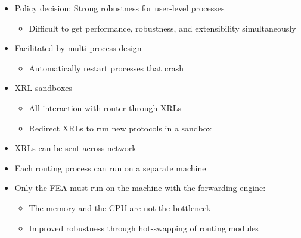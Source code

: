 \documentclass[landscape]{icsislides}
\begin{document}
\begin{slide}

\begin{itemize}

  \item Policy decision: Strong robustness for user-level processes
  \begin{itemize}
    \item Difficult to get performance, robustness, and extensibility
    simultaneously
  \end{itemize}

  \item Facilitated by multi-process design
  \begin{itemize}
    \item Automatically restart processes that crash
  \end{itemize}

  \item XRL sandboxes
  \begin{itemize}
    \item All interaction with router through XRLs
    \item Redirect XRLs to run new protocols in a sandbox
  \end{itemize}

\end{itemize}

\end{slide}

\begin{slide}

\begin{itemize}

  \item XRLs can be sent across network

  \item Each routing process can run on a separate machine

  \item Only the FEA must run on the machine with the forwarding engine:
  \begin{itemize}
    \item The memory and the CPU are not the bottleneck
    \item Improved robustness through hot-swapping of routing modules
  \end{itemize}

\end{itemize}

\end{slide}
\end{document}
